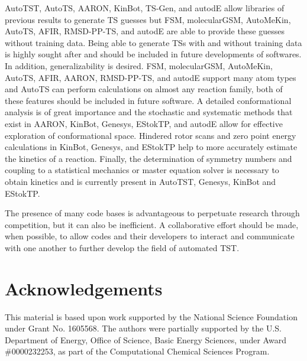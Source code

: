\documentclass[preprint, 11pt]{elsarticle} %
\begin{document}
AutoTST, AutoTS, AARON, KinBot, TS-Gen, and autodE allow libraries of previous results to generate TS guesses but FSM, molecularGSM, AutoMeKin, AutoTS, AFIR, RMSD-PP-TS, and autodE are able to provide these guesses without training data.
Being able to generate TSs with and without training data is highly sought after and should be included in future developments of softwares.
In addition, generalizability is desired.
FSM, molecularGSM, AutoMeKin, AutoTS, AFIR, AARON, RMSD-PP-TS, and autodE support many atom types and AutoTS can perform calculations on almost any reaction family, both of these features should be included in future software.
A detailed conformational analysis is of great importance and the stochastic and systematic methods that exist in AARON, KinBot, Genesys, EStokTP, and autodE allow for effective exploration of conformational space.
Hindered rotor scans and zero point energy calculations in KinBot, Genesys, and EStokTP help to more accurately estimate the kinetics of a reaction.
Finally, the determination of symmetry numbers and coupling to a statistical mechanics or master equation solver is necessary to obtain kinetics and is currently present in AutoTST, Genesys, KinBot and EStokTP.

The presence of many code bases is advantageous to perpetuate research through competition, but it can also be inefficient.
A collaborative effort should be made, when possible, to allow codes and their developers to interact and communicate with one another to further develop the field of automated TST.



\section{Acknowledgements}

This material is based upon work supported by the National Science Foundation under Grant No. 1605568.
The authors were partially supported by the U.S. Department of Energy, Office of Science, Basic Energy Sciences, under Award \#0000232253, as part of the Computational Chemical Sciences Program.





\end{document}
